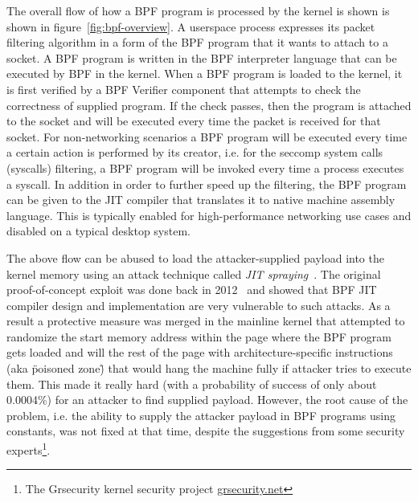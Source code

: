 The overall flow of how a BPF program is processed by the kernel is shown is shown in figure~\ref{fig:bpf-overview}.  
A userspace process expresses its packet filtering algorithm in a form of the BPF program that it wants to attach to a socket. A BPF program is written in the BPF interpreter language that can be executed by BPF in the kernel. When a BPF program is loaded to the kernel, it is first verified by a BPF Verifier component that attempts to check the correctness of supplied program. If the check passes, then the program is attached to the socket and will be executed every time the packet is received for that socket. For non-networking scenarios a BPF program will be executed every time a certain action is performed by its creator, i.e. for the seccomp system calls (syscalls) filtering, a BPF program will be invoked every time a process executes a syscall. In addition in order to further speed up the filtering, the BPF program can be given to the JIT compiler that translates it to native machine assembly language. This is typically enabled for high-performance networking use cases and disabled on a typical desktop system.  

The above flow can be abused to load the attacker-supplied payload into the kernel memory using an attack technique called \textit{JIT spraying}~\cite{blazakis2010, bania2010jit}. The original proof-of-concept exploit was done back in 2012~\cite{mcallister2012attacking} and showed that BPF JIT compiler design and implementation are very vulnerable to such attacks. As a result a protective measure was merged in the mainline kernel that attempted to randomize the start memory address within the page where the BPF program gets loaded and will the rest of the page with architecture-specific instructions (aka \"poisoned zone\") that would hang the machine fully if attacker tries to execute them. This made it really hard (with a probability of success of only about 0.0004\%) for an attacker to find supplied payload. However, the root cause of the problem, i.e. the ability to supply the attacker payload in BPF programs using constants, was not fixed at that time, despite the suggestions from some security experts\footnote{The Grsecurity kernel security project \url{grsecurity.net}}.

